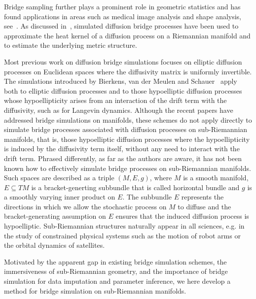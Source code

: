 \documentclass[10pt]{amsart}
\theoremstyle{remark}
\numberwithin{equation}{section}
\begin{document}
Bridge sampling further plays a prominent role in geometric statistics and has found applications in areas such as medical image analysis and shape analysis, see~\cite{shape1}. As discussed in~\cite{medical2}, simulated diffusion bridge processes have been used to approximate the heat kernel of a diffusion process on a Riemannian manifold and to estimate the underlying metric structure.

Most previous work on diffusion bridge simulations focuses on elliptic diffusion processes on Euclidean spaces where the diffusivity matrix is uniformly invertible. The simulations introduced by Bierkens, van der Meulen and Schauer~\cite{bridgesim5} apply both to elliptic diffusion processes and to those hypoelliptic diffusion processes whose hypoellipticity arises from an interaction of the drift term with the diffusivity, such as for Langevin dynamics.
Although the recent papers \cite{JS21,buiInferencePartiallyObserved2023,corstanjeSimulatingConditionedDiffusions2024} have addressed bridge simulations on manifolds, these schemes do not apply directly to simulate bridge processes associated with diffusion processes on sub-Riemannian manifolds, that is, those hypoelliptic diffusion processes where the hypoellipticity is induced by the diffusivity term itself, without any need to interact with the drift term. Phrased differently, as far as the authors are aware, it has not been known how to effectively simulate bridge processes on sub-Riemannian manifolds. Such spaces are described as a triple $(M,E,g)$, where $M$ is a smooth manifold, $E\subseteq TM$ is a bracket-generting subbundle that is called horizontal bundle and $g$ is a smoothly varying inner product on $E$. The subbundle $E$ represents the directions in which we allow the stochastic process on $M$ to diffuse and the bracket-generating assumption on $E$ ensures that the induced diffusion process is hypoelliptic. Sub-Riemannian structures naturally appear in all sciences, e.g. in the study of constrained physical systems such as the motion of robot arms or the orbital dynamics of satellites.

Motivated by the apparent gap in existing bridge simulation schemes, the immersiveness of sub-Riemannian geometry, and the importance of bridge simulation for data imputation and parameter inference, we here develop a method for bridge simulation on sub-Riemannian manifolds.

\smallskip
\end{document}
